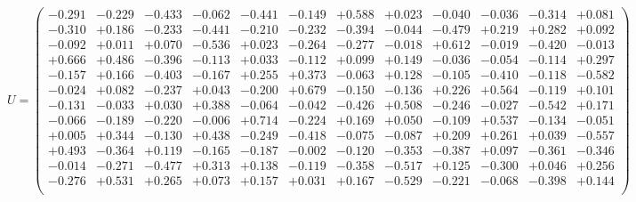 \documentclass[9pt]{article}
\theoremstyle{plain}
\theoremstyle{definition}
\theoremstyle{remark}
\numberwithin{equation}{section}
\begin{document}
$U = \left(
\begin{array}{
cccccccccccc}
-0.291 & -0.229 & -0.433 & -0.062 & -0.441 & -0.149 & +0.588 & +0.023 & -0.040 & -0.036 & -0.314 & +0.081 \\
-0.310 & +0.186 & -0.233 & -0.441 & -0.210 & -0.232 & -0.394 & -0.044 & -0.479 & +0.219 & +0.282 & +0.092 \\
-0.092 & +0.011 & +0.070 & -0.536 & +0.023 & -0.264 & -0.277 & -0.018 & +0.612 & -0.019 & -0.420 & -0.013 \\
+0.666 & +0.486 & -0.396 & -0.113 & +0.033 & -0.112 & +0.099 & +0.149 & -0.036 & -0.054 & -0.114 & +0.297 \\
-0.157 & +0.166 & -0.403 & -0.167 & +0.255 & +0.373 & -0.063 & +0.128 & -0.105 & -0.410 & -0.118 & -0.582 \\
-0.024 & +0.082 & -0.237 & +0.043 & -0.200 & +0.679 & -0.150 & -0.136 & +0.226 & +0.564 & -0.119 & +0.101 \\
-0.131 & -0.033 & +0.030 & +0.388 & -0.064 & -0.042 & -0.426 & +0.508 & -0.246 & -0.027 & -0.542 & +0.171 \\
-0.066 & -0.189 & -0.220 & -0.006 & +0.714 & -0.224 & +0.169 & +0.050 & -0.109 & +0.537 & -0.134 & -0.051 \\
+0.005 & +0.344 & -0.130 & +0.438 & -0.249 & -0.418 & -0.075 & -0.087 & +0.209 & +0.261 & +0.039 & -0.557 \\
+0.493 & -0.364 & +0.119 & -0.165 & -0.187 & -0.002 & -0.120 & -0.353 & -0.387 & +0.097 & -0.361 & -0.346 \\
-0.014 & -0.271 & -0.477 & +0.313 & +0.138 & -0.119 & -0.358 & -0.517 & +0.125 & -0.300 & +0.046 & +0.256 \\
-0.276 & +0.531 & +0.265 & +0.073 & +0.157 & +0.031 & +0.167 & -0.529 & -0.221 & -0.068 & -0.398 & +0.144 \\
\end{array}
\right)$ \newline 
\end{document}
